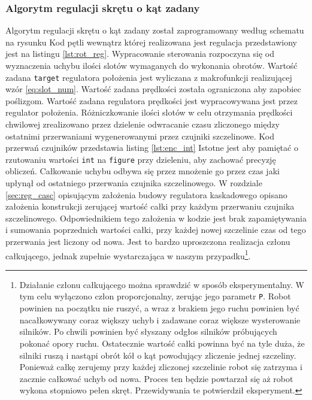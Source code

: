 \documentclass[11pt]{article}
\begin{document}
\subsubsection{Algorytm regulacji skrętu o kąt zadany}
Algorytm regulacji skrętu o kąt zadany został zaprogramowany według schematu na rysunku %
Kod pętli wewnątrz której realizowana jest regulacja przedstawiony jest na listingu \ref{lst:rot_reg}.
Wypracowanie sterowania rozpoczyna się od wyznaczenia uchybu ilości slotów wymaganych do wykonania obrotów.
Wartość zadana \texttt{target} regulatora położenia jest wyliczana z makrofunkcji realizującej wzór \ref{eq:slot_num}.
Wartość zadana prędkości została ograniczona aby zapobiec poślizgom.
Wartość zadana regulatora prędkości jest wypracowywana jest przez regulator położenia.
Różniczkowanie ilości slotów w celu otrzymania prędkości chwilowej zrealizowano przez dzielenie odwracanie czasu zliczonego między ostatnimi przerwaniami wygenerowanymi przez czujniki szczelinowe.
Kod przerwań czujników przedstawia listing \ref{lst:enc_int}
Istotne jest aby pamiętać o rzutowaniu wartości \texttt{int} na \texttt{figure} przy dzieleniu, aby zachować precyzję obliczeń.
Całkowanie uchybu odbywa się przez mnożenie go przez czas jaki upłynął od ostatniego przerwania czujnika szczelinowego.
W rozdziale \ref{sec:reg_casc} opisującym założenia budowy regulatora kaskadowego opisano założenia konstrukcji zerującej wartość całki przy każdym przerwaniu czujnika szczelinowego.
Odpowiednikiem tego założenia w kodzie jest brak zapamiętywania i sumowania poprzednich wartości całki, przy każdej nowej szczelinie czas od tego przerwania jest liczony od nowa.
Jest to bardzo uproszczona realizacja członu całkującego, jednak zupełnie wystarczająca w naszym przypadku\footnote{
	Działanie członu całkującego można sprawdzić w sposób eksperymentalny.
	W tym celu wyłączono człon proporcjonalny, zerując jego parametr \texttt{P}.
	Robot powinien na początku nie ruszyć, a wraz z brakiem jego ruchu powinien być nacałkowywany coraz większy uchyb i zadawane coraz większe wysterowanie silników.
	Po chwili powinien być słyszany odgłos silników próbujących pokonać opory ruchu.
	Ostatecznie wartość całki powinna być na tyle duża, że silniki ruszą i nastąpi obrót kół o kąt powodujący zliczenie jednej szczeliny.
	Ponieważ całkę zerujemy przy każdej zliczonej szczelinie robot się zatrzyma i zacznie całkować uchyb od nowa.
	Proces ten będzie powtarzał się aż robot wykona stopniowo pełen skręt.
	Przewidywania te potwierdził eksperyment.
}.



\end{document}
